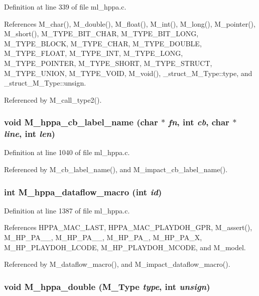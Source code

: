 Definition at line 339 of file ml\_\-hppa.c.

References M\_\-char(), M\_\-double(), M\_\-float(), M\_\-int(), M\_\-long(), M\_\-pointer(), M\_\-short(), M\_\-TYPE\_\-BIT\_\-CHAR, M\_\-TYPE\_\-BIT\_\-LONG, M\_\-TYPE\_\-BLOCK, M\_\-TYPE\_\-CHAR, M\_\-TYPE\_\-DOUBLE, M\_\-TYPE\_\-FLOAT, M\_\-TYPE\_\-INT, M\_\-TYPE\_\-LONG, M\_\-TYPE\_\-POINTER, M\_\-TYPE\_\-SHORT, M\_\-TYPE\_\-STRUCT, M\_\-TYPE\_\-UNION, M\_\-TYPE\_\-VOID, M\_\-void(), \_\-struct\_\-M\_\-Type::type, and \_\-struct\_\-M\_\-Type::unsign.

Referenced by M\_\-call\_\-type2().
\subsubsection{\setlength{\rightskip}{0pt plus 5cm}void M\_\-hppa\_\-cb\_\-label\_\-name (char $\ast$ {\em fn}, int {\em cb}, char $\ast$ {\em line}, int {\em len})}\label{ml__hppa_8c_ef9ecb67aecbb17a603e49fe02ec7526}




Definition at line 1040 of file ml\_\-hppa.c.

Referenced by M\_\-cb\_\-label\_\-name(), and M\_\-impact\_\-cb\_\-label\_\-name().
\subsubsection{\setlength{\rightskip}{0pt plus 5cm}int M\_\-hppa\_\-dataflow\_\-macro (int {\em id})}\label{ml__hppa_8c_0aa4627b19c9098354b28bcee7e191c7}




Definition at line 1387 of file ml\_\-hppa.c.

References HPPA\_\-MAC\_\-LAST, HPPA\_\-MAC\_\-PLAYDOH\_\-GPR, M\_\-assert(), M\_\-HP\_\-PA\_\_, M\_\-HP\_\-PA\_\_, M\_\-HP\_\-PA\_, M\_\-HP\_\-PA\_\-X, M\_\-HP\_\-PLAYDOH\_\-LCODE, M\_\-HP\_\-PLAYDOH\_\-MCODE, and M\_\-model.

Referenced by M\_\-dataflow\_\-macro(), and M\_\-impact\_\-dataflow\_\-macro().
\subsubsection{\setlength{\rightskip}{0pt plus 5cm}void M\_\-hppa\_\-double (\bf{M\_\-Type} {\em type}, int {\em unsign})}\label{ml__hppa_8c_36512d3fc7f9e32d3ded009049067802}




